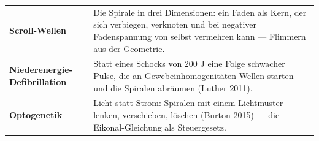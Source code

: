 \begin{forschung}
\begin{center}
{\small
\renewcommand{\arraystretch}{1.45}
\begin{tabular}{@{}P{3.0cm}P{5.2cm}@{}}
\toprule
\textbf{Scroll-Wellen} & Die Spirale in drei Dimensionen: ein Faden als Kern, der sich verbiegen, verknoten und bei negativer Fadenspannung von selbst vermehren kann --- Flimmern aus der Geometrie.\\
\textbf{Niederenergie-Defibrillation} & Statt eines Schocks von $200$ J eine Folge schwacher Pulse, die an Gewebeinhomogenitäten Wellen starten und die Spiralen abräumen (Luther 2011).\\
\textbf{Optogenetik} & Licht statt Strom: Spiralen mit einem Lichtmuster lenken, verschieben, löschen (Burton 2015) --- die Eikonal-Gleichung als Steuergesetz.\\
\bottomrule
\end{tabular}}
\end{center}

\begin{center}
\begin{minipage}{0.88\textwidth}
\end{minipage}
\end{center}
\end{forschung}

